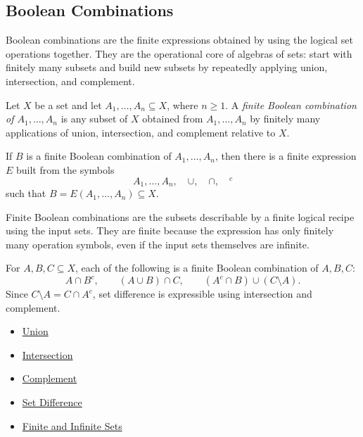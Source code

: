 \subsection{Boolean Combinations}

\begin{remark*}[Exposition]
Boolean combinations are the finite expressions obtained by using the logical
set operations together.  They are the operational core of algebras of sets:
start with finitely many subsets and build new subsets by repeatedly applying
union, intersection, and complement.
\end{remark*}

\begin{definition}\label{def:finite-boolean-combination}
Let \(X\) be a set and let \(A_1,\dots,A_n\subseteq X\), where \(n\geq 1\).
A \emph{finite Boolean combination of \(A_1,\dots,A_n\)} is any subset of
\(X\) obtained from \(A_1,\dots,A_n\) by finitely many applications of union,
intersection, and complement relative to \(X\).
\end{definition}

\begin{remark*}
If \(B\) is a finite Boolean combination of \(A_1,\dots,A_n\), then there is a
finite expression \(E\) built from the symbols
\[
  A_1,\dots,A_n,\quad \cup,\quad \cap,\quad {}^c
\]
such that \(B=E(A_1,\dots,A_n)\subseteq X\).
\end{remark*}

\begin{remark*}[Interpretation]
Finite Boolean combinations are the subsets describable by a finite logical
recipe using the input sets.  They are finite because the expression has only
finitely many operation symbols, even if the input sets themselves are
infinite.
\end{remark*}

\begin{remark*}[Examples]
For \(A,B,C\subseteq X\), each of the following is a finite Boolean
combination of \(A,B,C\):
\[
  A\cap B^c,
  \qquad
  (A\cup B)\cap C,
  \qquad
  (A^c\cap B)\cup(C\setminus A).
\]
Since \(C\setminus A=C\cap A^c\), set difference is expressible using
intersection and complement.
\end{remark*}

\begin{dependencies}
\begin{itemize}
  \item \hyperref[def:union]{Union}
  \item \hyperref[def:intersection]{Intersection}
  \item \hyperref[def:complement]{Complement}
  \item \hyperref[def:set-difference]{Set Difference}
  \item \hyperref[def:finite-infinite]{Finite and Infinite Sets}
\end{itemize}
\end{dependencies}
